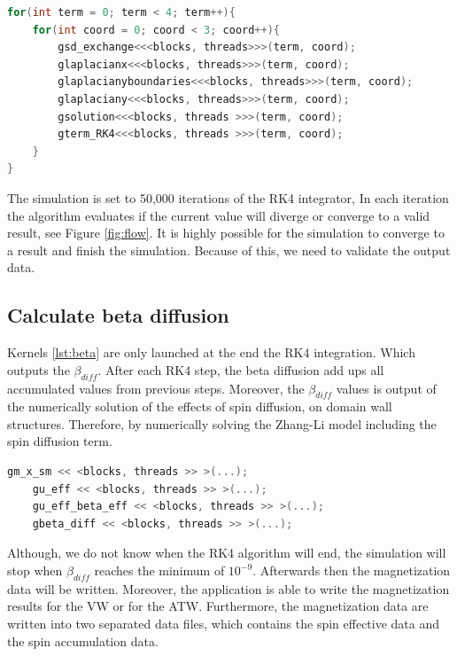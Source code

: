 \begin{lstlisting}[language=C++, label={lst:rk4}, caption={Summarize of Runge and Kutta 4th Integration}]
for(int term = 0; term < 4; term++){
	for(int coord = 0; coord < 3; coord++){
    	gsd_exchange<<<blocks, threads>>>(term, coord);
    	glaplacianx<<<blocks, threads>>>(term, coord);
    	glaplacianyboundaries<<<blocks, threads>>>(term, coord);
    	glaplaciany<<<blocks, threads>>>(term, coord);
    	gsolution<<<blocks, threads >>>(term, coord);
    	gterm_RK4<<<blocks, threads >>>(term, coord);
    }
}
\end{lstlisting}

 The simulation is set to 50,000 iterations of the RK4 integrator, In each iteration the algorithm evaluates if the current value will diverge or converge to a valid result, see Figure \ref{fig:flow}. It is highly possible for the simulation to converge to a result and finish the simulation. Because of this, we need to validate the output data.
 
\subsection{Calculate beta diffusion}

Kernels \ref{lst:beta} are only launched at the end the RK4 integration. Which outputs the $\beta_{diff}$. After each RK4 step, the beta diffusion add ups all accumulated values from previous steps. Moreover, the $\beta_{diff}$ values is output of the numerically solution of the effects of spin diffusion, on domain wall structures. Therefore, by numerically solving the Zhang-Li model including the spin diffusion term.

\begin{lstlisting}[language=C++, label={lst:beta}, caption={Calculate beta diffusion }]
    gm_x_sm << <blocks, threads >> >(...); 
    gu_eff << <blocks, threads >> >(...); 
    gu_eff_beta_eff << <blocks, threads >> >(...); 	
    gbeta_diff << <blocks, threads >> >(...);               
\end{lstlisting}

Although, we do not know when the RK4 algorithm will end, the simulation will stop when $\beta_{diff}$ reaches the minimum of $10^{-9}$. Afterwards then the magnetization data will be written. Moreover, the application is able to write the magnetization results for the VW or for the ATW. Furthermore, the magnetization data are written into two separated data files, which contains the spin effective data and the spin accumulation data.

